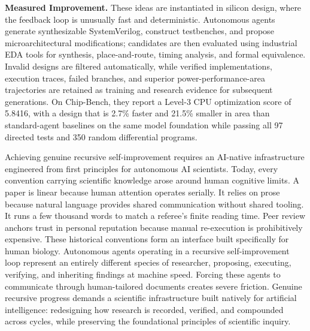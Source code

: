 \textbf{Measured Improvement.} These ideas are instantiated in silicon design, where the feedback loop is unusually fast and deterministic. Autonomous agents generate synthesizable SystemVerilog, construct testbenches, and propose microarchitectural modifications; candidates are then evaluated using industrial EDA tools for synthesis, place-and-route, timing analysis, and formal equivalence. Invalid designs are filtered automatically, while verified implementations, execution traces, failed branches, and superior power-performance-area trajectories are retained as training and research evidence for subsequent generations. On Chip-Bench, they report a Level-3 CPU optimization score of 5.8416, with a design that is 2.7\% faster and 21.5\% smaller in area than standard-agent baselines on the same model foundation while passing all 97 directed tests and 350 random differential programs.







\iffalse
Achieving genuine recursive self-improvement requires an AI-native infrastructure engineered from first principles for autonomous AI scientists. 
Today, every convention carrying scientific knowledge arose around human cognitive limits. A paper is linear because human attention operates serially. It relies on prose because natural language provides shared communication without shared tooling. It runs a few thousand words to match a referee's finite reading time. Peer review anchors trust in personal reputation because manual re-execution is prohibitively expensive. These historical conventions form an interface built specifically for human biology. Autonomous agents operating in a recursive self-improvement loop represent an entirely different species of researcher, proposing, executing, verifying, and inheriting findings at machine speed. Forcing these agents to communicate through human-tailored documents creates severe friction. Genuine recursive progress demands a scientific infrastructure built natively for artificial intelligence: redesigning how research is recorded, verified, and compounded across cycles, while preserving the foundational principles of scientific inquiry.

